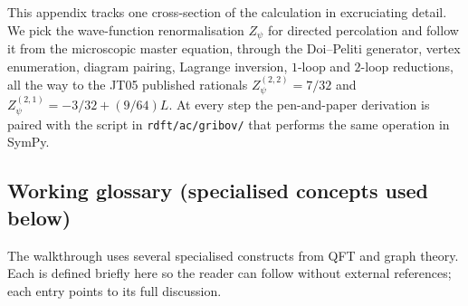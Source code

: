 \documentclass[11pt,a4paper]{article}
\theoremstyle{definition}
\theoremstyle{plain}
\begin{document}
This appendix tracks one cross-section of the calculation in
excruciating detail.  We pick the wave-function renormalisation
$Z_\psi$ for directed percolation and follow it from the microscopic
master equation, through the Doi--Peliti generator, vertex
enumeration, diagram pairing, Lagrange inversion, $1$-loop and
$2$-loop reductions, all the way to the JT05 published rationals
$Z_\psi^{(2,2)} = 7/32$ and $Z_\psi^{(2,1)} = -3/32 + (9/64)L$.
At every step the pen-and-paper derivation is paired with the
script in \texttt{rdft/ac/gribov/} that performs the same operation
in SymPy.

\subsection{Working glossary (specialised concepts used below)}
\label{app:glossary}

The walkthrough uses several specialised constructs from QFT and
graph theory.  Each is defined briefly here so the reader can follow
without external references; each entry points to its full
discussion.
\end{document}
